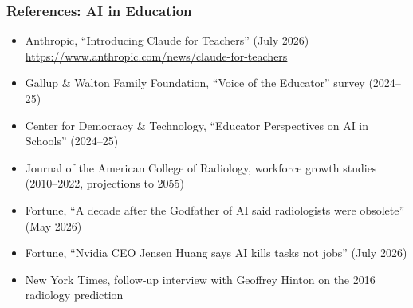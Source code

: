 \begin{frame}\frametitle{References: AI in Education}
\small
\begin{itemize}
\item Anthropic, ``Introducing Claude for Teachers'' (July 2026) \\ \url{https://www.anthropic.com/news/claude-for-teachers}
\item Gallup \& Walton Family Foundation, ``Voice of the Educator'' survey (2024--25)
\item Center for Democracy \& Technology, ``Educator Perspectives on AI in Schools'' (2024--25)
\item Journal of the American College of Radiology, workforce growth studies (2010--2022, projections to 2055)
\item Fortune, ``A decade after the Godfather of AI said radiologists were obsolete'' (May 2026)
\item Fortune, ``Nvidia CEO Jensen Huang says AI kills tasks not jobs'' (July 2026)
\item New York Times, follow-up interview with Geoffrey Hinton on the 2016 radiology prediction
\end{itemize}
\end{frame}
